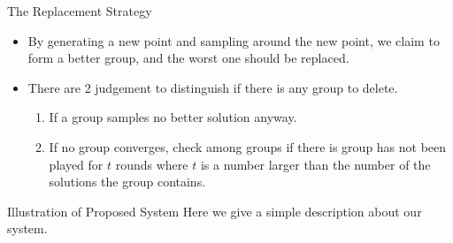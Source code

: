 \begin{frame}{The Replacement Strategy}
  \begin{itemize}
    \item By generating a new point and sampling around the new point,
      we claim to form a better group, and the worst one should be
      replaced.
      \vspace*{14pt}
    \item There are 2 judgement to distinguish if there is any group to
      delete.
      \begin{enumerate}
        \item If a group samples no better solution anyway.
        \item If no group converges, check among groups if there is
          group has not been played for $t$ rounds where $t$ is a
          number larger than the number of the solutions the group
          contains.
      \end{enumerate}
  \end{itemize}
\end{frame}
\begin{frame}{Illustration of Proposed System}
  Here we give a simple description about our system.
  \vspace*{8pt}
\end{frame}





